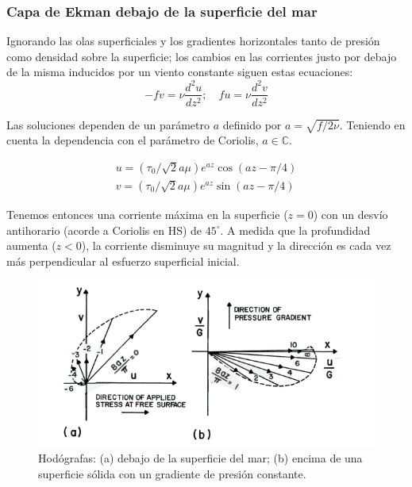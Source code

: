 \documentclass[openany]{book}
\begin{document}
\subsubsection{Capa de Ekman debajo de la superficie del mar}
Ignorando las olas superficiales y los gradientes horizontales tanto
de presión como densidad sobre la superficie; los cambios en las
corrientes justo por debajo de la misma inducidos por un viento
constante siguen estas ecuaciones:
\begin{equation}
    -fv=\nu \frac{d^2u}{dz^2};\quad fu=\nu \frac{d^2v}{dz^2}
\end{equation}

\par Las soluciones dependen de un parámetro $a$ definido por
$a=\sqrt{f/2\nu}$. Teniendo en cuenta la dependencia con el parámetro
de Coriolis, $a\in\mathbb{C}$.

\begin{gather}
    u=(\tau_0/\sqrt{2}a\mu)e^{az}\cos{(az-\pi/4)}\\
    v=(\tau_0/\sqrt{2}a\mu)e^{az}\sin{(az-\pi/4)}
\end{gather}

\par Tenemos entonces una corriente máxima en la superficie ($z=0$)
con un desvío antihorario (acorde a Coriolis en HS) de $45^\circ$. A
medida que la profundidad aumenta ($z<0$), la corriente disminuye su
magnitud y la dirección es cada vez más perpendicular al esfuerzo
superficial inicial.

\begin{figure}[htbp]
    \centering
    \includegraphics[width=\linewidth]{img/ekman-HS.png} 
    \caption{Hodógrafas: (a) debajo de la superficie del mar; (b)
    encima de una superficie sólida con un gradiente de presión
    constante.}
    \label{fig:ekman}
\end{figure}
\end{document}
